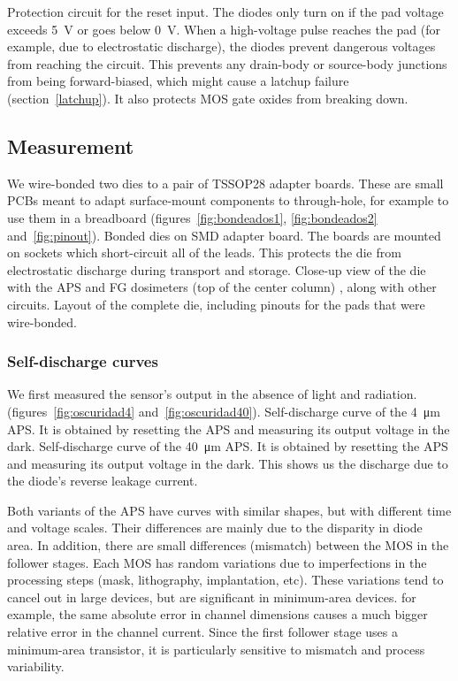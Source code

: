 {Protection circuit for the reset input.
The diodes only turn on if the pad voltage exceeds
\SI{5}{\volt} or goes below \SI{0}{\volt}.
When a high-voltage pulse reaches the pad
(for example, due to electrostatic discharge),
the diodes prevent dangerous voltages from reaching the circuit.
This prevents any drain-body or source-body junctions from being forward-biased,
which might cause a latchup failure (section~\ref{latchup}).
It also protects MOS gate oxides from breaking down.}
\subsection{Measurement}
We wire-bonded two dies to a pair of TSSOP28 adapter boards.
These are small PCBs meant to adapt surface-mount components
to through-hole, for example to use them in a breadboard
(figures~\ref{fig:bondeados1}, \ref{fig:bondeados2} and~\ref{fig:pinout}).
{Bonded dies on SMD adapter board.
The boards are mounted on sockets which short-circuit all of the leads.
This protects the die from electrostatic discharge during transport and storage.
}
{Close-up view of the die with the APS and FG dosimeters
(top of the center column)
, along with other circuits.}
{Layout of the complete die, including pinouts for the pads that were wire-bonded.}
\subsubsection{Self-discharge curves}
We first measured the sensor's output in the absence of light and radiation.
(figures~\ref{fig:oscuridad4} and~\ref{fig:oscuridad40}).
{Self-discharge curve of the \SI{4}{\micro\meter} APS.
It is obtained by resetting the APS and measuring its output voltage in the dark.}
{Self-discharge curve of the \SI{40}{\micro\meter} APS.
It is obtained by resetting the APS and measuring its output voltage in the dark.}
This shows us the discharge due to the diode's reverse leakage current.

Both variants of the APS have curves with similar shapes,
but with different time and voltage scales.
Their differences are mainly due to the disparity in diode area.
In addition, there are small differences (mismatch) between the MOS in the follower stages.
Each MOS has random variations due to imperfections in the processing steps
(mask, lithography, implantation, etc).
These variations tend to cancel out in large devices,
but are significant in minimum-area devices.
for example, the same absolute error in channel dimensions causes
a much bigger relative error in the channel current.
Since the first follower stage uses a minimum-area transistor,
it is particularly sensitive to mismatch and process variability.


